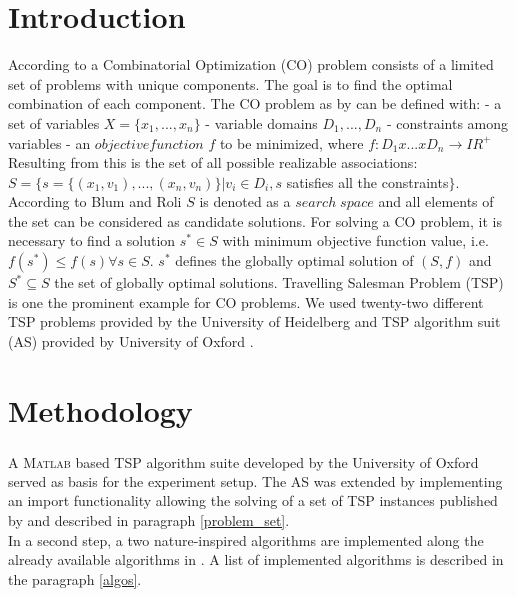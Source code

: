 \documentclass[conference]{IEEEtran}
\begin{document}
	\section{Introduction}
 	According to \cite{bernhard2008combinatorial, halim2019combinatorial, gutin2006traveling} a Combinatorial Optimization (CO) problem consists of a limited set of problems with unique components. The goal is to find the optimal combination of each component. The CO problem as by  \cite{blum2003metaheuristics} can be defined with:\newline
 	- a set of variables $X = \{x_1,...,x_n\}$\newline
 	- variable domains $D_1,...,D_n$\newline
 	- constraints among variables\newline
 	- an $objective function$ $f$ to be minimized, where $f:D_1x ... xD_n \xrightarrow{} IR^+$\newline
 	Resulting from this is the set of all possible realizable associations: 
 	$S=\{s=\{(x_1,v_1),...,(x_n,v_n)\} | v_i \in{} D_i, s$ satisfies all the constraints$\}$. According to Blum and Roli \cite{blum2003metaheuristics} $S$ is denoted as a $search \; space$ and all elements of the set can be considered as candidate solutions. For solving a CO problem, it is necessary to find a solution $s^* \in S$ with minimum objective function value, i.e. $f(s^*) \leq f(s) \forall s \in S$. $s^*$ defines the globally optimal solution of $(S,f)$ and $S^* \subseteq S$ the set of globally optimal solutions. Travelling Salesman Problem (TSP) is one the prominent example for CO problems.
	We used twenty-two different TSP problems provided by the University of Heidelberg \cite{tsplib201heidelberg} and TSP algorithm suit (AS) provided by University of Oxford \cite{tsp2019sheridan}. 
	
	\section{Methodology}
	A \textsc{Matlab}\textsuperscript{\textregistered} based TSP algorithm suite developed by the University of Oxford \cite{tsp2019sheridan} served as basis for the experiment setup. The AS was extended by implementing an import functionality allowing the solving of a set of TSP instances published by \cite{tsplib2019} and described in paragraph \ref{problem_set}.\\
 	In a second step, a two nature-inspired algorithms are implemented along the already available algorithms in \cite{tsp2019sheridan}. A list of implemented algorithms is described in the paragraph \ref{algos}.
\end{document}
